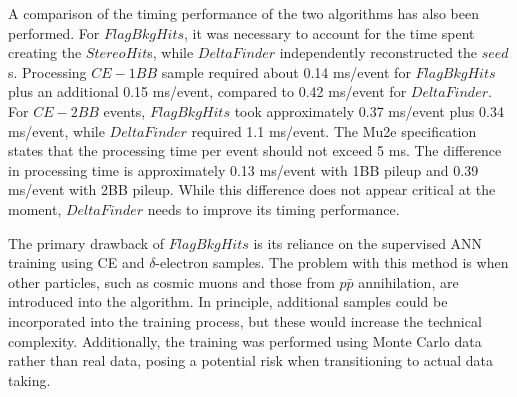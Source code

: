 A comparison of the timing performance of the 
two algorithms has also been performed.
For $FlagBkgHits$, it was necessary to account for the time 
spent creating the $StereoHit$s, while $DeltaFinder$ independently 
reconstructed the $seed$s. Processing $CE-1BB$ sample required about 
0.14 ms/event for $FlagBkgHits$ plus an additional 0.15 ms/event, 
compared to 0.42 ms/event for $DeltaFinder$. For $CE-2BB$ events, 
$FlagBkgHits$ took approximately 0.37 ms/event plus 0.34 ms/event, 
while $DeltaFinder$ required 1.1 ms/event. The Mu2e specification states 
that the processing time per event should not exceed 5 ms. The 
difference in processing time is approximately 0.13 ms/event with 
1BB pileup and 0.39 ms/event with 2BB pileup. While this difference 
does not appear critical at the moment, $DeltaFinder$ needs to improve its timing performance.

The primary drawback of $FlagBkgHits$ is its reliance 
on the supervised ANN training using CE and $\delta$-electron samples. 
The problem with this method is when other particles, such as cosmic muons 
and those from $p\bar{p}$ annihilation, are introduced into the algorithm. 
In principle, additional samples could be incorporated into the training 
process, but these would increase the technical complexity. 
Additionally, the training was performed using Monte Carlo data 
rather than real data, posing a potential risk when transitioning 
to actual data taking. 

